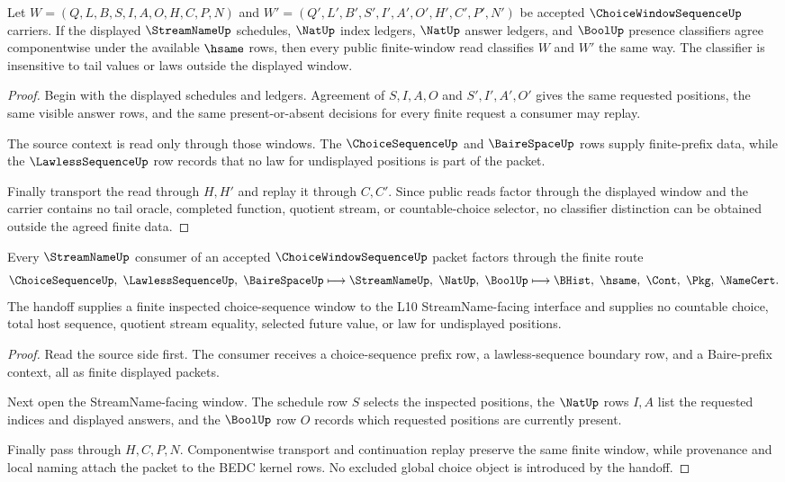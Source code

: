 \begin{theorem}
\label{thm:choice-window-sequence-window-classifier-stability}
Let $W=(Q,L,B,S,I,A,O,H,C,P,N)$ and $W'=(Q',L',B',S',I',A',O',H',C',P',N')$ be accepted $\ChoiceWindowSequenceUp$ carriers. If the displayed $\StreamNameUp$ schedules, $\NatUp$ index ledgers, $\NatUp$ answer ledgers, and $\BoolUp$ presence classifiers agree componentwise under the available $\hsame$ rows, then every public finite-window read classifies $W$ and $W'$ the same way. The classifier is insensitive to tail values or laws outside the displayed window.
\end{theorem}
\begin{proof}
Begin with the displayed schedules and ledgers. Agreement of $S,I,A,O$ and $S',I',A',O'$ gives the same requested positions, the same visible answer rows, and the same present-or-absent decisions for every finite request a consumer may replay.

The source context is read only through those windows. The $\ChoiceSequenceUp$ and $\BaireSpaceUp$ rows supply finite-prefix data, while the $\LawlessSequenceUp$ row records that no law for undisplayed positions is part of the packet.

Finally transport the read through $H,H'$ and replay it through $C,C'$. Since public reads factor through the displayed window and the carrier contains no tail oracle, completed function, quotient stream, or countable-choice selector, no classifier distinction can be obtained outside the agreed finite data.
\end{proof}

\begin{theorem}
\label{thm:choice-window-sequence-streamname-handoff}
Every $\StreamNameUp$ consumer of an accepted $\ChoiceWindowSequenceUp$ packet factors through the finite route
$$
\ChoiceSequenceUp,\ \LawlessSequenceUp,\ \BaireSpaceUp
\longmapsto
\StreamNameUp,\ \NatUp,\ \BoolUp
\longmapsto
\BHist,\ \hsame,\ \Cont,\ \Pkg,\ \NameCert .
$$
The handoff supplies a finite inspected choice-sequence window to the L10 StreamName-facing interface and supplies no countable choice, total host sequence, quotient stream equality, selected future value, or law for undisplayed positions.
\end{theorem}
\begin{proof}
Read the source side first. The consumer receives a choice-sequence prefix row, a lawless-sequence boundary row, and a Baire-prefix context, all as finite displayed packets.

Next open the StreamName-facing window. The schedule row $S$ selects the inspected positions, the $\NatUp$ rows $I,A$ list the requested indices and displayed answers, and the $\BoolUp$ row $O$ records which requested positions are currently present.

Finally pass through $H,C,P,N$. Componentwise transport and continuation replay preserve the same finite window, while provenance and local naming attach the packet to the BEDC kernel rows. No excluded global choice object is introduced by the handoff.
\end{proof}

